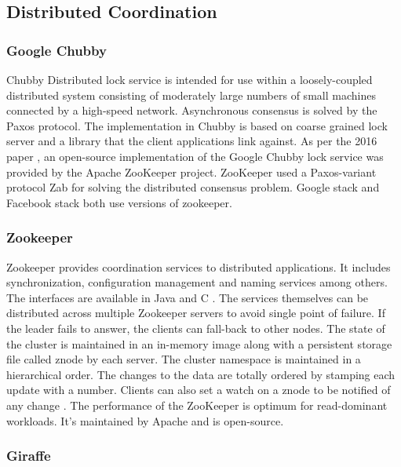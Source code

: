 \subsection{Distributed Coordination}


\subsubsection{Google Chubby}

     Chubby Distributed lock service \cite{www-chubby}
     is intended for use within a loosely-coupled distributed system
     consisting of moderately large numbers of small machines
     connected by a high-speed network. Asynchronous consensus is
     solved by the Paxos protocol. The implementation in Chubby is
     based on coarse grained lock server and a library that the client
     applications link against.  As per the 2016 paper
     \cite{chubby-paper-2016}, an open-source implementation of the
     Google Chubby lock service was provided by the Apache ZooKeeper
     project. ZooKeeper used a Paxos-variant protocol Zab for solving
     the distributed consensus problem.  Google stack and Facebook
     stack both use versions of zookeeper.
     
\subsubsection{Zookeeper}
 
     Zookeeper provides coordination services to distributed applications.
     It includes synchronization, configuration management and naming
     services among others. The interfaces are available in Java and C
     \cite{www-zoo-overiew}. The services themselves can be distributed
     across multiple Zookeeper servers to avoid single point of failure.
     If the leader fails to answer, the clients can fall-back to other
     nodes. The state of the cluster is maintained in an in-memory image
     along with a persistent storage file called znode by each server. The
     cluster namespace is maintained in a hierarchical order. The changes to the
     data are totally ordered \cite{www-zoo-wiki} by stamping each update
     with a number. Clients can also set a watch on a znode to be notified
     of any change \cite{www-zoo-ibm}. The performance of the ZooKeeper
     is optimum for read-dominant workloads. It's maintained by Apache
     and is open-source.

\subsubsection{Giraffe}

